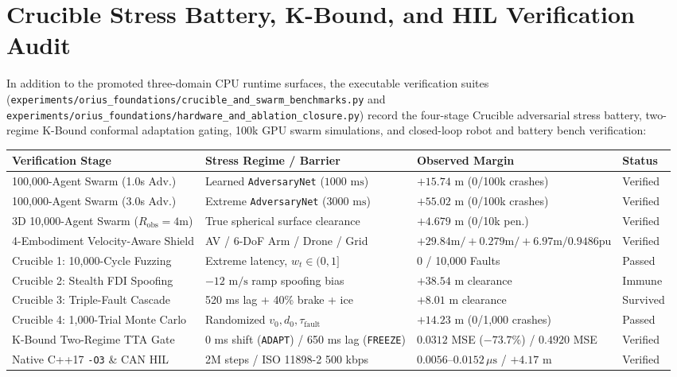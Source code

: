 \documentclass[11pt,oneside]{report}
\begin{document}
\chapter{Crucible Stress Battery, K-Bound, and HIL Verification Audit}
In addition to the promoted three-domain CPU runtime surfaces, the executable verification suites (\texttt{experiments/orius\_foundations/crucible\_and\_swarm\_benchmarks.py} and \texttt{experiments/orius\_foundations/hardware\_and\_ablation\_closure.py}) record the four-stage Crucible adversarial stress battery, two-regime K-Bound conformal adaptation gating, 100k GPU swarm simulations, and closed-loop robot and battery bench verification:
\begin{longtable}{p{}p{}p{}p{}}
\toprule
\textbf{Verification Stage} & \textbf{Stress Regime / Barrier} & \textbf{Observed Margin} & \textbf{Status}\\
\midrule
\endfirsthead
100,000-Agent Swarm (1.0s Adv.) & Learned \texttt{AdversaryNet} ($1000\text{ ms}$) & $+15.74\text{ m}$ (0/100k crashes) & Verified\\
100,000-Agent Swarm (3.0s Adv.) & Extreme \texttt{AdversaryNet} ($3000\text{ ms}$) & $+55.02\text{ m}$ (0/100k crashes) & Verified\\
3D 10,000-Agent Swarm ($R_{\mathrm{obs}}=4\text{m}$) & True spherical surface clearance & $+4.679\text{ m}$ (0/10k pen.) & Verified\\
4-Embodiment Velocity-Aware Shield & AV / 6-DoF Arm / Drone / Grid & $+29.84\text{m} / +0.279\text{m} / +6.97\text{m} / 0.9486\text{pu}$ & Verified\\
Crucible 1: 10,000-Cycle Fuzzing & Extreme latency, $w_t \in (0, 1]$ & 0 / 10,000 Faults & Passed\\
Crucible 2: Stealth FDI Spoofing & $-12\text{ m/s}$ ramp spoofing bias & $+38.54\text{ m}$ clearance & Immune\\
Crucible 3: Triple-Fault Cascade & 520 ms lag + 40\% brake + ice & $+8.01\text{ m}$ clearance & Survived\\
Crucible 4: 1,000-Trial Monte Carlo & Randomized $v_0, d_0, \tau_{\mathrm{fault}}$ & $+14.23\text{ m}$ (0/1,000 crashes) & Passed\\
K-Bound Two-Regime TTA Gate & 0 ms shift (\texttt{ADAPT}) / 650 ms lag (\texttt{FREEZE}) & $0.0312$ MSE ($-73.7\%$) / $0.4920$ MSE & Verified\\
Native C++17 \texttt{-O3} \& CAN HIL & 2M steps / ISO 11898-2 500 kbps & $0.0056\text{--}0.0152\,\mu\text{s}$ / $+4.17\text{ m}$ & Verified\\

\end{longtable}
\end{document}
